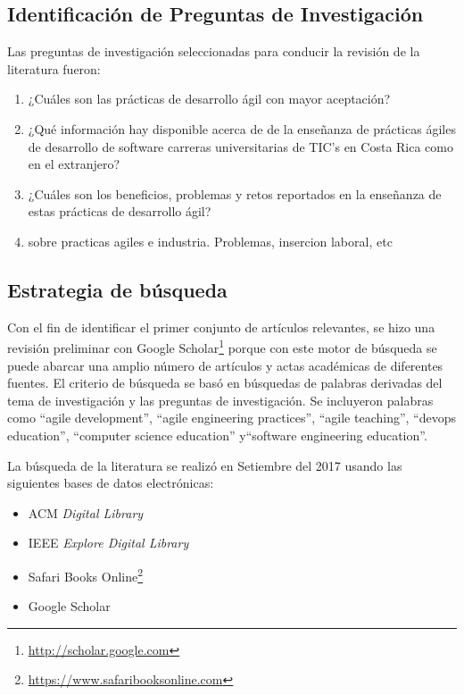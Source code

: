 \documentclass[journal]{IEEEtran}
\begin{document}
\subsection{Identificación de Preguntas de Investigación}
Las preguntas de investigación seleccionadas para conducir la revisión de la literatura fueron:
\begin{enumerate}
    \item ¿Cuáles son las prácticas de desarrollo ágil con mayor aceptación?
    \item ¿Qué información hay disponible acerca de de la enseñanza de prácticas ágiles de desarrollo de software carreras universitarias de TIC's en Costa Rica como en el extranjero? 
    \item ¿Cuáles son los beneficios, problemas y retos reportados en la enseñanza de estas prácticas de desarrollo ágil?
    \item sobre practicas agiles e industria. Problemas, insercion laboral, etc
\end{enumerate}

\subsection{Estrategia de búsqueda}
Con el fin de identificar el primer conjunto de artículos relevantes, se hizo una revisión preliminar con Google Scholar\footnote{\url{http://scholar.google.com}} porque con este motor de búsqueda se puede abarcar una amplio número de artículos y actas académicas de diferentes fuentes. El criterio de búsqueda se basó en búsquedas de palabras derivadas del tema de investigación y las preguntas de investigación. Se incluyeron palabras como ``agile development'', ``agile engineering practices'', ``agile teaching'', ``devops education'', ``computer science education'' y``software engineering education''. 

La búsqueda de la literatura se realizó en Setiembre del 2017 usando las siguientes bases de datos electrónicas:
\begin{itemize}
    \item ACM \emph{Digital Library} 
    \item IEEE \emph{Explore Digital Library}
    \item Safari Books Online\footnote{\url{https://www.safaribooksonline.com}}
    \item Google Scholar
\end{itemize}
\end{document}
